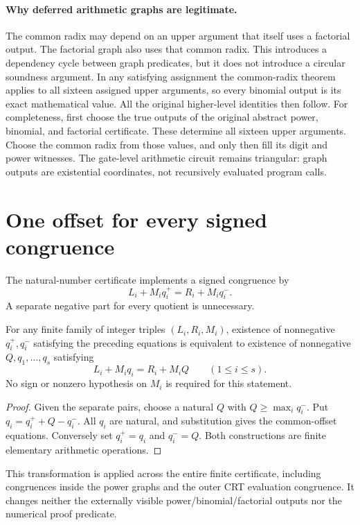 \paragraph{Why deferred arithmetic graphs are legitimate.}
The common radix may depend on an upper argument that itself uses a
factorial output. The factorial graph also uses that common radix.
This introduces a dependency cycle between graph predicates, but it
does not introduce a circular soundness argument. In any satisfying
assignment the common-radix theorem applies to all sixteen assigned
upper arguments, so every binomial output is its exact mathematical
value. All the original higher-level identities then follow.
For completeness, first choose the true outputs of the original
abstract power, binomial, and factorial certificate. These determine
all sixteen upper arguments. Choose the common radix from those
values, and only then fill its digit and power witnesses. The
gate-level arithmetic circuit remains triangular: graph outputs are
existential coordinates, not recursively evaluated program calls.

\section{One offset for every signed congruence}
\label{sec:one-offset}

The natural-number certificate implements a signed congruence by
\[
 L_i+M_iq_i^+=R_i+M_iq_i^-.
\]
A separate negative part for every quotient is unnecessary.

\begin{theorem}
For any finite family of integer triples $(L_i,R_i,M_i)$, existence
of nonnegative $q_i^+,q_i^-$ satisfying the preceding equations is
equivalent to existence of nonnegative $Q,q_1,\ldots,q_s$ satisfying
\[
 L_i+M_iq_i=R_i+M_iQ\qquad(1\le i\le s).
\]
No sign or nonzero hypothesis on $M_i$ is required for this statement.
\end{theorem}

\begin{proof}
Given the separate pairs, choose a natural $Q$ with
$Q\ge\max_i q_i^-$. Put $q_i=q_i^++Q-q_i^-$. All $q_i$ are natural,
and substitution gives the common-offset equations. Conversely set
$q_i^+=q_i$ and $q_i^-=Q$. Both constructions are finite elementary
arithmetic operations.
\end{proof}

This transformation is applied across the entire finite certificate,
including congruences inside the power graphs and the outer CRT
evaluation congruence. It changes neither the externally visible
power/binomial/factorial outputs nor the numerical proof predicate.

